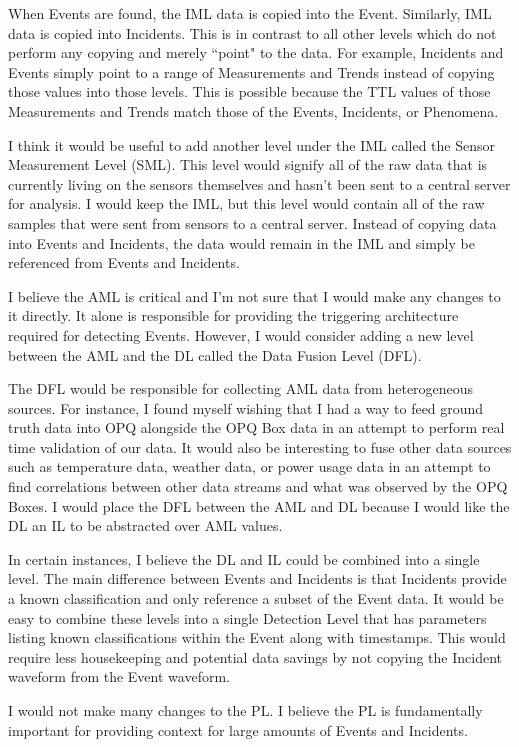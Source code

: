When Events are found, the IML data is copied into the Event. Similarly, IML data is copied into Incidents. This is in contrast to all other levels which do not perform any copying and merely ``point" to the data. For example, Incidents and Events simply point to a range of Measurements and Trends instead of copying those values into those levels. This is possible because the TTL values of those Measurements and Trends match those of the Events, Incidents, or Phenomena.

I think it would be useful to add another level under the IML called the Sensor Measurement Level (SML). This level would signify all of the raw data that is currently living on the sensors themselves and hasn't been sent to a central server for analysis. I would keep the IML, but this level would contain all of the raw samples that were sent from sensors to a central server. Instead of copying data into Events and Incidents, the data would remain in the IML and simply be referenced from Events and Incidents.

I believe the AML is critical and I'm not sure that I would make any changes to it directly. It alone is responsible for providing the triggering architecture required for detecting Events. However, I would consider adding a new level between the AML and the DL called the Data Fusion Level (DFL).

The DFL would be responsible for collecting AML data from heterogeneous sources. For instance, I found myself wishing that I had a way to feed ground truth data into OPQ alongside the OPQ Box data in an attempt to perform real time validation of our data. It would also be interesting to fuse other data sources such as temperature data, weather data, or power usage data in an attempt to find correlations between other data streams and what was observed by the OPQ Boxes. I would place the DFL between the AML and DL because I would like the DL an IL to be abstracted over AML values.

In certain instances, I believe the DL and IL could be combined into a single level. The main difference between Events and Incidents is that Incidents provide a known classification and only reference a subset of the Event data. It would be easy to combine these levels into a single Detection Level that has parameters listing known classifications within the Event along with timestamps. This would require less housekeeping and potential data savings by not copying the Incident waveform from the Event waveform.

I would not make many changes to the PL. I believe the PL is fundamentally important for providing context for large amounts of Events and Incidents.

